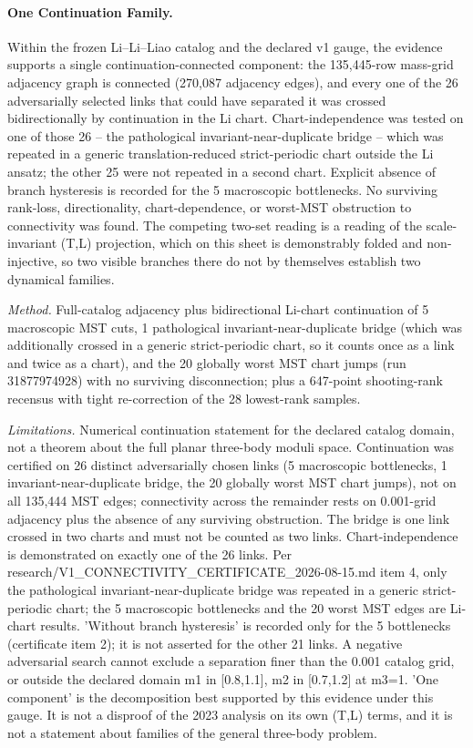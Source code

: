 \sloppy
\paragraph{One Continuation Family.}
Within the frozen Li--Li--Liao catalog and the declared v1 gauge, the evidence supports a single continuation-connected component: the 135,445-row mass-grid adjacency graph is connected (270,087 adjacency edges), and every one of the 26 adversarially selected links that could have separated it was crossed bidirectionally by continuation in the Li chart. Chart-independence was tested on one of those 26 -- the pathological invariant-near-duplicate bridge -- which was repeated in a generic translation-reduced strict-periodic chart outside the Li ansatz; the other 25 were not repeated in a second chart. Explicit absence of branch hysteresis is recorded for the 5 macroscopic bottlenecks. No surviving rank-loss, directionality, chart-dependence, or worst-MST obstruction to connectivity was found. The competing two-set reading is a reading of the scale-invariant (T,L) projection, which on this sheet is demonstrably folded and non-injective, so two visible branches there do not by themselves establish two dynamical families.

\emph{Method.} Full-catalog adjacency plus bidirectional Li-chart continuation of 5 macroscopic MST cuts, 1 pathological invariant-near-duplicate bridge (which was additionally crossed in a generic strict-periodic chart, so it counts once as a link and twice as a chart), and the 20 globally worst MST chart jumps (run 31877974928) with no surviving disconnection; plus a 647-point shooting-rank recensus with tight re-correction of the 28 lowest-rank samples.

\emph{Limitations.} Numerical continuation statement for the declared catalog domain, not a theorem about the full planar three-body moduli space. Continuation was certified on 26 distinct adversarially chosen links (5 macroscopic bottlenecks, 1 invariant-near-duplicate bridge, the 20 globally worst MST chart jumps), not on all 135,444 MST edges; connectivity across the remainder rests on 0.001-grid adjacency plus the absence of any surviving obstruction. The bridge is one link crossed in two charts and must not be counted as two links. Chart-independence is demonstrated on exactly one of the 26 links. Per research/V1\_CONNECTIVITY\_CERTIFICATE\_2026-08-15.md item 4, only the pathological invariant-near-duplicate bridge was repeated in a generic strict-periodic chart; the 5 macroscopic bottlenecks and the 20 worst MST edges are Li-chart results. 'Without branch hysteresis' is recorded only for the 5 bottlenecks (certificate item 2); it is not asserted for the other 21 links. A negative adversarial search cannot exclude a separation finer than the 0.001 catalog grid, or outside the declared domain m1 in [0.8,1.1], m2 in [0.7,1.2] at m3=1. 'One component' is the decomposition best supported by this evidence under this gauge. It is not a disproof of the 2023 analysis on its own (T,L) terms, and it is not a statement about families of the general three-body problem.

